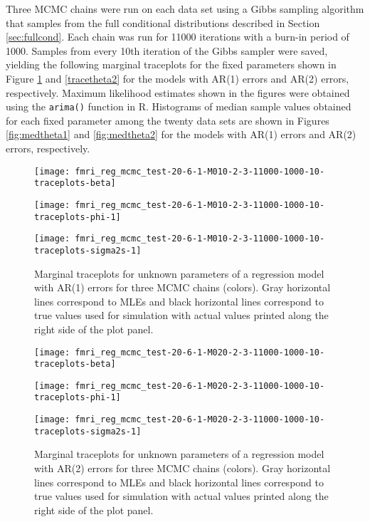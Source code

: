 \documentclass{article}
\begin{document}
Three MCMC chains were run on each data set using a Gibbs sampling algorithm that samples from the full conditional distributions described in Section \ref{sec:fullcond}. Each chain was run for 11000 iterations with a burn-in period of 1000. Samples from every 10th iteration of the Gibbs sampler were saved, yielding the following marginal traceplots for the fixed parameters shown in Figure \ref{fig:tracetheta1} and \ref{tracetheta2} for the models with AR(1) errors and AR(2) errors, respectively. Maximum likelihood estimates shown in the figures were obtained using the {\tt arima()} function in R. Histograms of median sample values obtained for each fixed parameter among the twenty data sets are shown in Figures \ref{fig:medtheta1} and \ref{fig:medtheta2} for the models with AR(1) errors and AR(2) errors, respectively.

\begin{figure}[ht]
\begin{minipage}{0.5\linewidth}
\texttt{[image: fmri\_reg\_mcmc\_test-20-6-1-M010-2-3-11000-1000-10-traceplots-beta]}
\end{minipage}
\begin{minipage}{0.5\linewidth}
\texttt{[image: fmri\_reg\_mcmc\_test-20-6-1-M010-2-3-11000-1000-10-traceplots-phi-1]}
\end{minipage}
\begin{minipage}{0.5\linewidth}
\texttt{[image: fmri\_reg\_mcmc\_test-20-6-1-M010-2-3-11000-1000-10-traceplots-sigma2s-1]}
\end{minipage}
\caption{Marginal traceplots for unknown parameters of a regression model with AR(1) errors for three MCMC chains (colors). Gray horizontal lines correspond to MLEs and black horizontal lines correspond to true values used for simulation with actual values printed along the right side of the plot panel.} \label{fig:tracetheta1}
\end{figure}

\begin{figure}[ht]
\begin{minipage}{0.5\linewidth}
\texttt{[image: fmri\_reg\_mcmc\_test-20-6-1-M020-2-3-11000-1000-10-traceplots-beta]}
\end{minipage}
\begin{minipage}{0.5\linewidth}
\texttt{[image: fmri\_reg\_mcmc\_test-20-6-1-M020-2-3-11000-1000-10-traceplots-phi-1]}
\end{minipage}
\begin{minipage}{0.5\linewidth}
\texttt{[image: fmri\_reg\_mcmc\_test-20-6-1-M020-2-3-11000-1000-10-traceplots-sigma2s-1]}
\end{minipage}
\caption{Marginal traceplots for unknown parameters of a regression model with AR(2) errors for three MCMC chains (colors). Gray horizontal lines correspond to MLEs and black horizontal lines correspond to true values used for simulation with actual values printed along the right side of the plot panel.} \label{fig:tracetheta2}
\end{figure}
\end{document}
